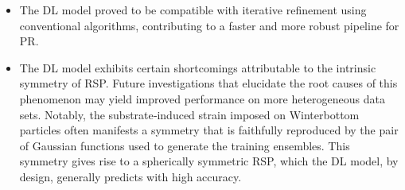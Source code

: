 \begin{itemize}
    \item The DL model proved to be compatible with iterative refinement using conventional algorithms, contributing to 
    a faster and more robust pipeline for PR. 

    \item The DL model exhibits certain shortcomings attributable to the intrinsic symmetry of RSP. Future investigations 
    that elucidate the root causes of this phenomenon may yield improved performance on more heterogeneous data sets. 
    Notably, the substrate‐induced strain imposed on Winterbottom particles often manifests a symmetry that is faithfully 
    reproduced by the pair of Gaussian functions used to generate the training ensembles. This symmetry gives rise to 
    a spherically symmetric RSP, which the DL model, by design, generally predicts with high accuracy. 

  \end{itemize}
